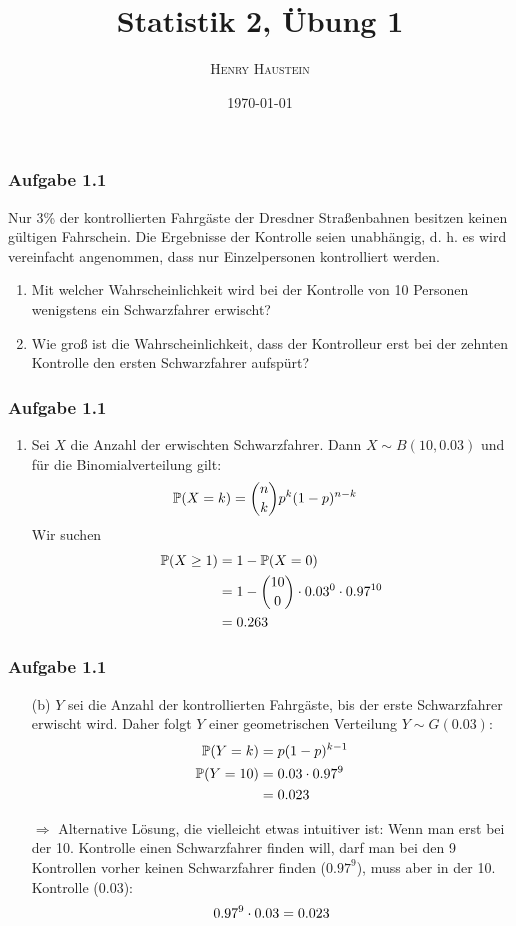 \documentclass[ngerman,t]{beamer}
\title{Statistik 2, Übung 1}
\author{\textsc{Henry Haustein}}
\institute{TU Dresden}
\date{\today}
\begin{document}
	\begin{frame}
		\titlepage
	\end{frame}

	\begin{frame}
		\frametitle{Aufgabe 1.1}
		Nur 3\% der kontrollierten Fahrgäste der Dresdner Straßenbahnen besitzen keinen gültigen Fahrschein. Die Ergebnisse der Kontrolle seien unabhängig, d. h. es wird vereinfacht angenommen, dass nur Einzelpersonen kontrolliert werden.
		\begin{enumerate}[label=(\alph*)]
			\item Mit welcher Wahrscheinlichkeit wird bei der Kontrolle von 10 Personen wenigstens ein Schwarzfahrer erwischt?
			\item Wie groß ist die Wahrscheinlichkeit, dass der Kontrolleur erst bei der zehnten Kontrolle den ersten Schwarzfahrer aufspürt?
		\end{enumerate}
	\end{frame}
	\begin{frame}
		\frametitle{Aufgabe 1.1}
		\begin{enumerate}[label=(\alph*)]
			\item Sei $X$ die Anzahl der erwischten Schwarzfahrer. Dann $X\sim B(10, 0.03)$ und für die Binomialverteilung gilt:
			\begin{align}
				\mathbb{P}(X = k) &= \binom{n}{k}p^k(1-p)^{n-k} \notag
			\end{align}
			\pause
			Wir suchen
			\begin{align}
				\mathbb{P}(X \ge 1) &= 1 - \mathbb{P}(X = 0) \notag \\
				&= 1 - \binom{10}{0}\cdot 0.03^0\cdot 0.97^{10} \notag \\
				&= 0.263 \notag
			\end{align}
		\end{enumerate}
	\end{frame}
	\begin{frame}
		\frametitle{Aufgabe 1.1}
		\begin{itemize}
			\item[(b)] $Y$ sei die Anzahl der kontrollierten Fahrgäste, bis der erste Schwarzfahrer erwischt wird. Daher folgt $Y$ einer geometrischen Verteilung $Y \sim G(0.03)$:
			\begin{align}
				\mathbb{P}(Y = k) &= p(1-p)^{k-1} \notag \\
				\mathbb{P}(Y = 10) &= 0.03\cdot 0.97^9 \notag \\
				&= 0.023 \notag
			\end{align}
			\pause
			\item[$\Rightarrow$] Alternative Lösung, die vielleicht etwas intuitiver ist: Wenn man erst bei der 10. Kontrolle einen Schwarzfahrer finden will, darf man bei den 9 Kontrollen vorher keinen Schwarzfahrer finden ($0.97^9$), muss aber in der 10. Kontrolle ($0.03$):
			\begin{align}
				0.97^9\cdot 0.03 = 0.023 \notag
			\end{align}
		\end{itemize}
	\end{frame}
\end{document}
